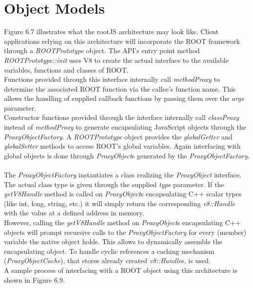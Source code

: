 \section{Object Models}
Figure 6.7 illustrates what the rootJS architecture may look like.
Client applications relying on this architecture will incorporate the ROOT framework through a \textit{ROOTPrototype} object.
The API's entry point method \textit{ROOTPrototype::init} uses V8 to create the actual interface to the available variables, functions and classes of ROOT.\\
Functions provided through this interface internally call \textit{methodProxy} to determine the associated ROOT function via the callee's function name. This allows the handling of supplied callback functions by passing them over the \textit{args} parameter.\\
Constructor functions provided through the interface internally call \textit{classProxy} instead of \textit{methodProxy} to generate encapsulating JavaScript objects through the \textit{ProxyObjectFactory}.
A \textit{ROOTPrototype} object provides the \textit{globalGetter} and \textit{globalSetter} methods to access ROOT's global variables. Again interfacing with global objects is done through \textit{ProxyObject}s generated by the \textit{ProxyObjectFactory}.
\\ \\
The \textit{ProxyObjectFactory} instantiates a class realizing the \textit{ProxyObject} interface. The actual class type is given through the supplied \textit{type} parameter.
If the \textit{getV8Handle} method is called on \textit{ProxyObject}s encapsulating C++ scalar types (like int, long, string, etc.) it will simply return the corresponding \textit{v8::Handle} with the value at a defined address in memory.\\
However, calling the \textit{getV8Handle} method on \textit{ProxyObject}s encapsulating C++ objects will prompt recursive calls to the \textit{ProxyObjectFactory} for every (member) variable the native object holds. This allows to dynamically assemble the encapsulating object.
To handle cyclic references a caching mechanism (\textit{ProxyObjectCache}), that stores already created \textit{v8::Handle}s, is used.\\
A sample process of interfacing with a ROOT object using this architecture is shown in Figure 6.9.
\pagebreak

